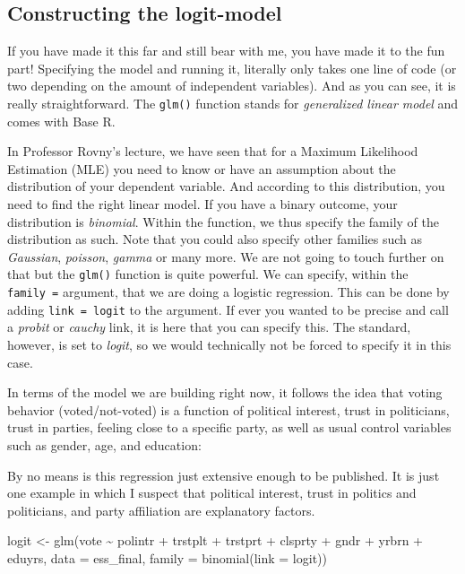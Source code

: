 \documentclass[
  letterpaper,
  DIV=11,
  numbers=noendperiod]{scrreprt}
\newenvironment{Shaded}{\begin{snugshade}}{\end{snugshade}}
\newcommand{\AttributeTok}[1]{\textcolor[rgb]{0.40,0.45,0.13}{#1}}
\newcommand{\FunctionTok}[1]{\textcolor[rgb]{0.28,0.35,0.67}{#1}}
\newcommand{\NormalTok}[1]{\textcolor[rgb]{0.00,0.23,0.31}{#1}}
\newcommand{\OtherTok}[1]{\textcolor[rgb]{0.00,0.23,0.31}{#1}}
\newcommand{\SpecialCharTok}[1]{\textcolor[rgb]{0.37,0.37,0.37}{#1}}
\begin{document}
\hypertarget{constructing-the-logit-model}{%
\subsection{Constructing the
logit-model}\label{constructing-the-logit-model}}

If you have made it this far and still bear with me, you have made it to
the fun part! Specifying the model and running it, literally only takes
one line of code (or two depending on the amount of independent
variables). And as you can see, it is really straightforward. The
\texttt{glm()} function stands for \emph{generalized linear model} and
comes with Base R.

In Professor Rovny's lecture, we have seen that for a Maximum Likelihood
Estimation (MLE) you need to know or have an assumption about the
distribution of your dependent variable. And according to this
distribution, you need to find the right linear model. If you have a
binary outcome, your distribution is \emph{binomial}. Within the
function, we thus specify the family of the distribution as such. Note
that you could also specify other families such as \emph{Gaussian},
\emph{poisson}, \emph{gamma} or many more. We are not going to touch
further on that but the \texttt{glm()} function is quite powerful. We
can specify, within the \texttt{family\ =} argument, that we are doing a
logistic regression. This can be done by adding \texttt{link\ =\ logit}
to the argument. If ever you wanted to be precise and call a
\emph{probit} or \emph{cauchy} link, it is here that you can specify
this. The standard, however, is set to \emph{logit}, so we would
technically not be forced to specify it in this case.

In terms of the model we are building right now, it follows the idea
that voting behavior (voted/not-voted) is a function of political
interest, trust in politicians, trust in parties, feeling close to a
specific party, as well as usual control variables such as gender, age,
and education:

By no means is this regression just extensive enough to be published. It
is just one example in which I suspect that political interest, trust in
politics and politicians, and party affiliation are explanatory factors.

\begin{Shaded}
\begin{Highlighting}[]
\NormalTok{logit }\OtherTok{\textless{}{-}} \FunctionTok{glm}\NormalTok{(vote }\SpecialCharTok{\textasciitilde{}}\NormalTok{ polintr }\SpecialCharTok{+}\NormalTok{ trstplt }\SpecialCharTok{+}\NormalTok{ trstprt }\SpecialCharTok{+}\NormalTok{ clsprty }\SpecialCharTok{+}\NormalTok{ gndr }\SpecialCharTok{+} 
\NormalTok{               yrbrn }\SpecialCharTok{+}\NormalTok{ eduyrs, }
             \AttributeTok{data =}\NormalTok{ ess\_final, }
             \AttributeTok{family =} \FunctionTok{binomial}\NormalTok{(}\AttributeTok{link =}\NormalTok{ logit))}
\end{Highlighting}
\end{Shaded}
\end{document}
